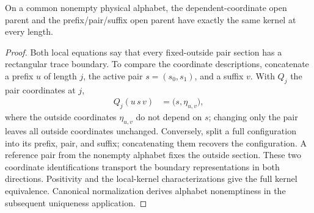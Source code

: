 \begin{lemma}
    \label{lem:uniform_physical_parent_kernel_comparison}
    \leanok
    On a common nonempty physical alphabet, the dependent-coordinate
    open parent and the prefix/pair/suffix open parent have exactly
    the same kernel at every length.
\end{lemma}
\begin{proof}\leanok
    Both local equations say that every fixed-outside pair section has a
    rectangular trace boundary. To compare the coordinate descriptions,
    concatenate a prefix $u$ of length $j$, the active pair $s=(s_0,s_1)$,
    and a suffix $v$. With $Q_j$ the pair coordinates at $j$,
    \begin{align}
        Q_j(u\,s\,v) & =\bigl(s,\eta_{u,v}\bigr),
        \label{eq:uniform_physical_pair_coordinates}
    \end{align}
    where the outside coordinates $\eta_{u,v}$ do not depend on $s$; changing
    only the pair leaves all outside coordinates unchanged. Conversely, split a full
    configuration into its prefix, pair, and suffix; concatenating
    them recovers the configuration. A reference pair from the nonempty
    alphabet fixes the outside section. These two coordinate identifications
    transport the boundary representations in both directions. Positivity
    and the local-kernel characterizations give the full kernel
    equivalence. Canonical normalization derives alphabet nonemptiness in
    the subsequent uniqueness application.
\end{proof}
